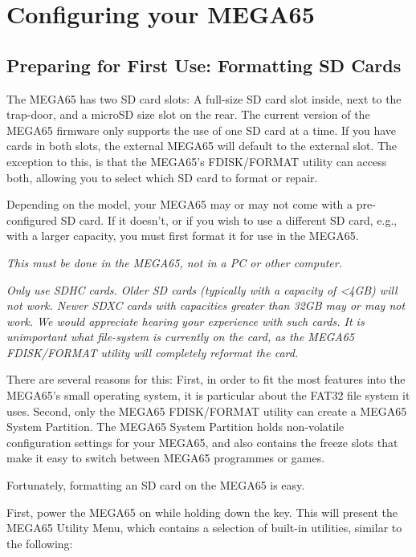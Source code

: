 \chapter{Configuring your MEGA65}
\label{cha:configuring}

\section{Preparing for First Use: Formatting SD Cards}

The MEGA65 has two SD card slots: A full-size SD card slot inside, next to
the trap-door, and a microSD size slot on the rear.  The current version
of the MEGA65 firmware only supports the use of one SD card at a time.
If you have cards in both slots, the external MEGA65 will default to the external slot. The exception to this, is that the MEGA65's FDISK/FORMAT
utility can access both, allowing you to select which SD card to format or
repair.

Depending on the model, your MEGA65 may or may not come with a pre-configured SD card. If it doesn't, or if you wish to use a different SD card, e.g., with a
larger capacity, you must first format it for use in the MEGA65.

{\em This must be done in the MEGA65, not in a PC or other computer.}

{\em Only use SDHC cards. Older SD cards (typically with
  a capacity of <4GB) will not work. Newer SDXC cards with
  capacities greater than 32GB may or may not work. We would
  appreciate hearing your experience with such cards. It is unimportant
  what file-system is currently on the card, as the MEGA65
  FDISK/FORMAT utility will completely reformat the card.}

There are several reasons for this: First, in order to fit the most
features into the MEGA65's small operating system, it is
particular about the FAT32 file system it uses. Second, only the
MEGA65 FDISK/FORMAT utility can create a MEGA65 System Partition. The
MEGA65 System Partition holds non-volatile configuration settings for
your MEGA65, and also contains the freeze slots that make it easy to
switch between MEGA65 programmes or games.

Fortunately, formatting an SD card on the MEGA65 is easy.

First, power the MEGA65 on while holding down the  key.
This will present the MEGA65 Utility Menu, which contains a
selection of built-in utilities, similar to the following:

